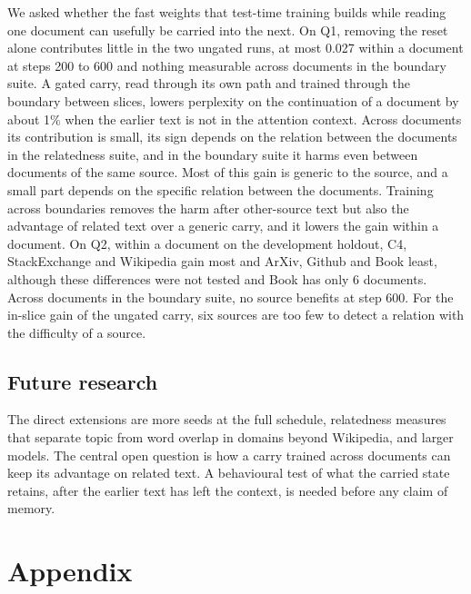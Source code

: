 \documentclass[10pt]{article} %
\begin{document}
We asked whether the fast weights that test-time training builds while reading one document can usefully be carried into the next. On Q1, removing the reset alone contributes little in the two ungated runs, at most 0.027 within a document at steps 200 to 600 and nothing measurable across documents in the boundary suite. A gated carry, read through its own path and trained through the boundary between slices, lowers perplexity on the continuation of a document by about 1\% when the earlier text is not in the attention context. Across documents its contribution is small, its sign depends on the relation between the documents in the relatedness suite, and in the boundary suite it harms even between documents of the same source. Most of this gain is generic to the source, and a small part depends on the specific relation between the documents. Training across boundaries removes the harm after other-source text but also the advantage of related text over a generic carry, and it lowers the gain within a document. On Q2, within a document on the development holdout, C4, StackExchange and Wikipedia gain most and ArXiv, Github and Book least, although these differences were not tested and Book has only 6 documents. Across documents in the boundary suite, no source benefits at step 600. For the in-slice gain of the ungated carry, six sources are too few to detect a relation with the difficulty of a source.

\subsection{Future research}

The direct extensions are more seeds at the full schedule, relatedness measures that separate topic from word overlap in domains beyond Wikipedia, and larger models. The central open question is how a carry trained across documents can keep its advantage on related text. A behavioural test of what the carried state retains, after the earlier text has left the context, is needed before any claim of memory.




\appendix
\section{Appendix}
\setcounter{table}{0}
\renewcommand{\thetable}{A.\arabic{table}}
\renewcommand{\theHtable}{A.\arabic{table}}
\setcounter{figure}{0}
\renewcommand{\thefigure}{A.\arabic{figure}}
\renewcommand{\theHfigure}{A.\arabic{figure}}
\end{document}

